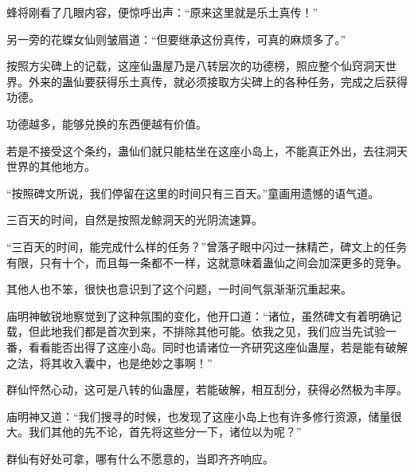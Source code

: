 \begin{this_body}
蜂将刚看了几眼内容，便惊呼出声：“原来这里就是乐土真传！”

另一旁的花蝶女仙则皱眉道：“但要继承这份真传，可真的麻烦多了。”

按照方尖碑上的记载，这座仙蛊屋乃是八转层次的功德榜，照应整个仙窍洞天世界。外来的蛊仙要获得乐土真传，就必须接取方尖碑上的各种任务，完成之后获得功德。

功德越多，能够兑换的东西便越有价值。

若是不接受这个条约，蛊仙们就只能枯坐在这座小岛上，不能真正外出，去往洞天世界的其他地方。

“按照碑文所说，我们停留在这里的时间只有三百天。”童画用遗憾的语气道。

三百天的时间，自然是按照龙鲸洞天的光阴流速算。

“三百天的时间，能完成什么样的任务？”曾落子眼中闪过一抹精芒，碑文上的任务有限，只有十个，而且每一条都不一样，这就意味着蛊仙之间会加深更多的竞争。

其他人也不笨，很快也意识到了这个问题，一时间气氛渐渐沉重起来。

庙明神敏锐地察觉到了这种氛围的变化，他开口道：“诸位，虽然碑文有着明确记载，但此地我们都是首次到来，不排除其他可能。依我之见，我们应当先试验一番，看看能否出得了这座小岛。同时也请诸位一齐研究这座仙蛊屋，若是能有破解之法，将其收入囊中，也是绝妙之事啊！”

群仙怦然心动，这可是八转的仙蛊屋，若能破解，相互刮分，获得必然极为丰厚。

庙明神又道：“我们搜寻的时候，也发现了这座小岛上也有许多修行资源，储量很大。我们其他的先不论，首先将这些分一下，诸位以为呢？”

群仙有好处可拿，哪有什么不愿意的，当即齐齐响应。

\end{this_body}

